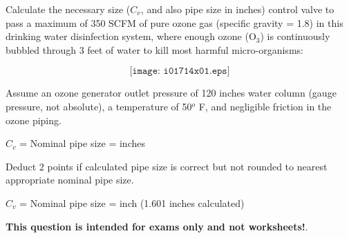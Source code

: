 

Calculate the necessary size ($C_v$, and also pipe size in inches) control valve to pass a maximum of 350 SCFM of pure ozone gas (specific gravity = 1.8) in this drinking water disinfection system, where enough ozone (O$_{3}$) is continuously bubbled through 3 feet of water to kill most harmful micro-organisms:

$$\texttt{[image: i01714x01.eps]}$$

Assume an ozone generator outlet pressure of 120 inches water column (gauge pressure, not absolute), a temperature of 50$^{o}$ F, and negligible friction in the ozone piping.

\vskip 10pt

$C_v$ = \underbar{\hskip 50pt} \hskip 100pt Nominal pipe size = \underbar{\hskip 50pt} inches







Deduct 2 points if calculated pipe size is correct but not rounded to nearest appropriate nominal pipe size.

\vskip 10pt

$C_v$ =  \hskip 50pt Nominal pipe size =  inch (1.601 inches calculated)







{\bf This question is intended for exams only and not worksheets!}.



